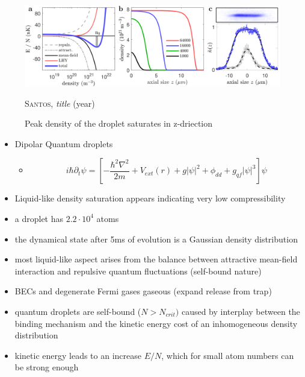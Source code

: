 \begin{figure}[H]
    \centering
    \includegraphics[width=1.0\textwidth]{IMAGE/droplet.png}\\
    \caption{Peak density of the droplet saturates in z-driection}
    \textsc{Santos}, \emph{title} (year)
    \label{fig:droplet}
\end{figure}

\begin{itemize}
    \item Dipolar Quantum droplets
    \begin{itemize}
        \item[]
            \begin{equation}
              i \hbar \partial_{t} \psi = \left[ - \frac{\hbar^{2} \nabla^{2}}{2 m}
                                          + V_{ext}(r)
                                          + g |\psi|^{2}
                                          + \phi_{dd}
                                          + g_{qf} |\psi|^{3} \right] \psi
            \end{equation}
    \end{itemize}
    \item Liquid-like density saturation appears indicating very low compressibility
    \item a droplet has $2.2 \cdot 10^{4}$ atoms
    \item the dynamical state after 5ms of evolution is a Gaussian density distribution
    \item most liquid-like aspect arises from the balance between attractive
        mean-field interaction and repulsive quantum fluctuations (self-bound nature)
    \item BECs and degenerate Fermi gases gaseous (expand release from trap)
    \item quantum droplets are self-bound ($N > N_{crit})$ caused by interplay between the binding mechanism
        and the kinetic energy cost of an inhomogeneous density distribution
    \item kinetic energy leads to an increase $E/N$, which for small atom numbers can be strong enough

\end{itemize}
